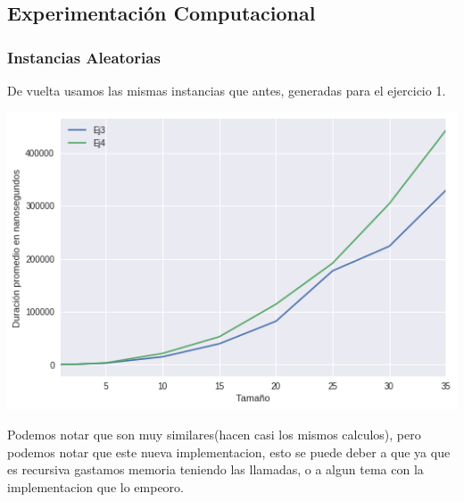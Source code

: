 \subsection*{Experimentación Computacional}
\subsubsection*{Instancias Aleatorias}
De vuelta usamos las mismas instancias que antes, generadas para el ejercicio 1.

\begin{center}
\includegraphics[scale=0.5]{ej4Random1-40.png}\\
\end{center}

Podemos notar que son muy similares(hacen casi los mismos calculos), pero podemos notar que este nueva implementacion, esto se puede deber a que ya que es recursiva gastamos memoria teniendo las llamadas, o a algun tema con la implementacion que lo empeoro.
